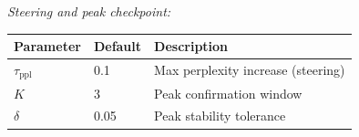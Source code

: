 \documentclass[11pt]{article}
\begin{document}
\noindent\textit{Steering and peak checkpoint:}
\begin{center}
\begin{tabular}{llp{}}
\toprule
\textbf{Parameter} & \textbf{Default} & \textbf{Description} \\
\midrule
$\tau_{\text{ppl}}$ & 0.1 & Max perplexity increase (steering) \\
$K$ & 3 & Peak confirmation window \\
$\delta$ & 0.05 & Peak stability tolerance \\
\bottomrule
\end{tabular}
\end{center}
\end{document}

